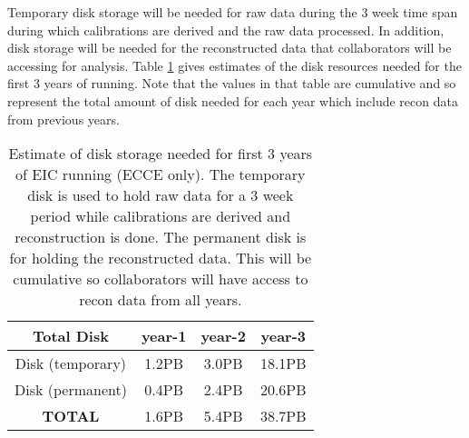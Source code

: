 Temporary disk storage will be needed for raw data during the 3 week time span during which calibrations are derived and the raw data processed. In addition, disk storage will be needed for the reconstructed data that collaborators will be accessing for analysis. Table \ref{tab:disk_summary} gives estimates of the disk resources needed for the first 3 years of running. Note that the values in that table are cumulative and so represent the total amount of disk needed for each year which include recon data from previous years.


\begin{table}[htb!]
    \centering
    \begin{tabular}{c|c|c|c}
        \hline
        \textbf{Total Disk} & year-1 & year-2 & year-3 \\
        \hline
        \hline
        Disk (temporary)  &  1.2PB & 3.0PB & 18.1PB \\
        \hline
        Disk (permanent)    & 0.4PB & 2.4PB &	20.6PB \\
        \hline
        \textbf{TOTAL}          & 1.6PB &	5.4PB &	38.7PB \\
        \hline
    \end{tabular}
    \caption{Estimate of disk storage needed for first 3 years of EIC running (ECCE only). The temporary disk is used to hold raw data for a 3 week period while calibrations are derived and reconstruction is done. The permanent disk is for holding the reconstructed data. This will be cumulative so collaborators will have access to recon data from all years.}
    \label{tab:disk_summary}
\end{table}

